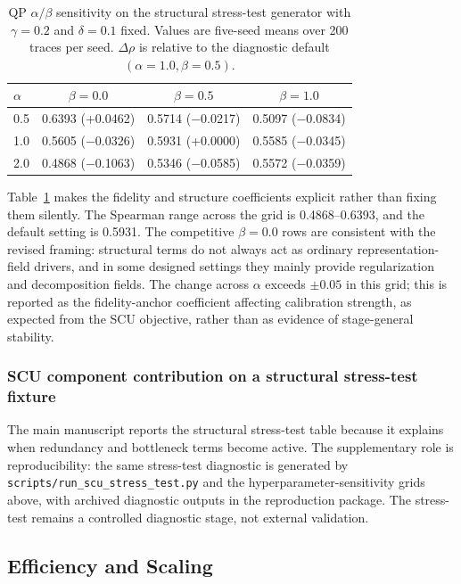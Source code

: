 \documentclass[a4paper,fleqn]{cas-sc}
\begin{document}
\begin{table}[ht]
\caption{QP $\alpha/\beta$ sensitivity on the structural stress-test generator with $\gamma=0.2$ and $\delta=0.1$ fixed. Values are five-seed means over 200 traces per seed. $\Delta\rho$ is relative to the diagnostic default $(\alpha=1.0,\beta=0.5)$.}
\label{tab:supp-alpha-beta-sensitivity}
\centering
\small
\begin{tabular}{lccc}
\toprule
\textbf{$\alpha$} & \textbf{$\beta=0.0$} & \textbf{$\beta=0.5$} & \textbf{$\beta=1.0$} \\
\midrule
0.5 & 0.6393 (+0.0462) & 0.5714 ($-$0.0217) & 0.5097 ($-$0.0834) \\
1.0 & 0.5605 ($-$0.0326) & 0.5931 (+0.0000) & 0.5585 ($-$0.0345) \\
2.0 & 0.4868 ($-$0.1063) & 0.5346 ($-$0.0585) & 0.5572 ($-$0.0359) \\
\bottomrule
\end{tabular}
\end{table}

Table~\ref{tab:supp-alpha-beta-sensitivity} makes the fidelity and structure coefficients explicit rather than fixing them silently. The Spearman range across the grid is 0.4868--0.6393, and the default setting is 0.5931. The competitive $\beta=0.0$ rows are consistent with the revised framing: structural terms do not always act as ordinary representation-field drivers, and in some designed settings they mainly provide regularization and decomposition fields. The change across $\alpha$ exceeds $\pm 0.05$ in this grid; this is reported as the fidelity-anchor coefficient affecting calibration strength, as expected from the SCU objective, rather than as evidence of stage-general stability.

\subsubsection{SCU component contribution on a structural stress-test fixture}

The main manuscript reports the structural stress-test table because it explains when redundancy and bottleneck terms become active. The supplementary role is reproducibility: the same stress-test diagnostic is generated by \texttt{scripts/run\_scu\_stress\_test.py} and the hyperparameter-sensitivity grids above, with archived diagnostic outputs in the reproduction package. The stress-test remains a controlled diagnostic stage, not external validation.

\subsection{Efficiency and Scaling}
\label{app:efficiency-scaling}
\end{document}
